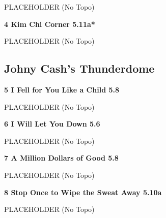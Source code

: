 \begin{multicols}{2}
\begin{adjustwidth}{0.5cm}{}			
PLACEHOLDER (No Topo)
\end{adjustwidth}



\needspace{1.5cm}
\label{rt:Kim Chi Corner}
\colorbox{RoyalBlue!20}{
\parbox{0.95\linewidth}{
\textbf{
4 Kim Chi Corner 5.11a*  
}}}

\begin{adjustwidth}{0.5cm}{}			
PLACEHOLDER (No Topo)
\end{adjustwidth}




\needspace{1.5cm}
\subsection*{Johny Cash's Thunderdome}\label{bf:Johny Cash's Thunderdome}
	


\needspace{1.5cm}
\label{rt:I Fell for You Like a Child}
\colorbox{green!20}{
\parbox{0.95\linewidth}{
\textbf{
5 I Fell for You Like a Child 5.8  
}}}

\begin{adjustwidth}{0.5cm}{}			
PLACEHOLDER (No Topo)
\end{adjustwidth}



\needspace{1.5cm}
\label{rt:I Will Let You Down}
\colorbox{green!20}{
\parbox{0.95\linewidth}{
\textbf{
6 I Will Let You Down 5.6  
}}}

\begin{adjustwidth}{0.5cm}{}			
PLACEHOLDER (No Topo)
\end{adjustwidth}



\needspace{1.5cm}
\label{rt:A Million Dollars of Good}
\colorbox{green!20}{
\parbox{0.95\linewidth}{
\textbf{
7 A Million Dollars of Good 5.8  
}}}

\begin{adjustwidth}{0.5cm}{}			
PLACEHOLDER (No Topo)
\end{adjustwidth}



\needspace{1.5cm}
\label{rt:Stop Once to Wipe the Sweat Away}
\colorbox{RoyalBlue!20}{
\parbox{0.95\linewidth}{
\textbf{
8 Stop Once to Wipe the Sweat Away 5.10a  
}}}

\begin{adjustwidth}{0.5cm}{}			
PLACEHOLDER (No Topo)
\end{adjustwidth}





\end{multicols}
\clearpage